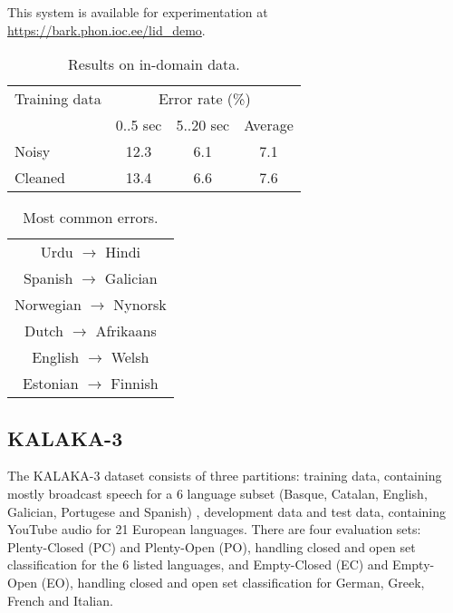 \documentclass{article}
\begin{document}
This system is available for experimentation at \url{https://bark.phon.ioc.ee/lid_demo}.

\begin{table}[tb]
\caption{Results on in-domain data. }
\label{tab:indomain}
\centering
\begin{tabular}{lccc}
\hline
Training data & \multicolumn{3}{c}{Error rate (\%)} \\
 & 0..5 sec  & 5..20 sec & Average \\
\hline
Noisy  & 12.3 & 6.1 & 7.1 \\
Cleaned & 13.4 & 6.6 & 7.6 \\
\hline
\end{tabular}
\end{table}

\begin{table}[tb]
\caption{Most common errors.}
\label{tab:indomain_err}
\centering
\begin{tabular}{c}
\hline
Urdu  $\xrightarrow{}$ Hindi \\
Spanish  $\xrightarrow{}$ Galician \\
Norwegian  $\xrightarrow{}$ Nynorsk \\
Dutch  $\xrightarrow{}$ Afrikaans  \\
English  $\xrightarrow{}$ Welsh  \\
Estonian   $\xrightarrow{}$ Finnish \\
\hline
\end{tabular}
\end{table}




\subsection{KALAKA-3}



The KALAKA-3 dataset \cite{rodriguez2016kalaka} consists of three partitions: training data, containing mostly broadcast speech for a 6 language subset (Basque, Catalan, English, Galician, Portugese and Spanish) \cite{rodriguezalbayzin},  development data and test data, containing YouTube audio for 21 European languages. There are four evaluation sets: Plenty-Closed (PC) and Plenty-Open (PO), handling closed and open set classification for the 6 listed languages, and Empty-Closed (EC) and Empty-Open  (EO), handling closed and open set classification for German, Greek, French and Italian. 
\end{document}
